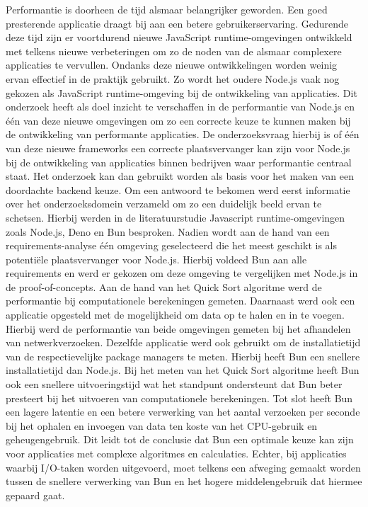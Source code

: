 Performantie is doorheen de tijd alsmaar belangrijker geworden. 
Een goed presterende applicatie draagt bij aan een betere gebruikerservaring.
Gedurende deze tijd zijn er voortdurend nieuwe JavaScript runtime-omgevingen ontwikkeld met telkens nieuwe verbeteringen om
zo de noden van de alsmaar complexere applicaties te vervullen. 
Ondanks deze nieuwe ontwikkelingen worden weinig ervan effectief in de praktijk gebruikt.
Zo wordt het oudere Node.js vaak nog gekozen als JavaScript runtime-omgeving bij de ontwikkeling van applicaties.
Dit onderzoek heeft als doel inzicht te verschaffen in de performantie van Node.js en één van deze nieuwe omgevingen
om zo een correcte keuze te kunnen maken bij de ontwikkeling van performante applicaties.
De onderzoeksvraag hierbij is of één van deze nieuwe frameworks  
een correcte plaatsvervanger kan zijn voor Node.js bij de ontwikkeling van applicaties binnen bedrijven 
waar performantie centraal staat. Het onderzoek kan dan gebruikt worden als basis 
voor het maken van een doordachte backend keuze.
Om een antwoord te bekomen werd eerst informatie over het onderzoeksdomein verzameld om zo een duidelijk beeld ervan te schetsen.
Hierbij werden in de literatuurstudie Javascript runtime-omgevingen zoals Node.js, Deno en Bun besproken.
Nadien wordt aan de hand van een requirements-analyse één omgeving geselecteerd die het meest geschikt is als potentiële plaatsvervanger voor Node.js.
Hierbij voldeed Bun aan alle requirements en werd er gekozen om deze omgeving te vergelijken met Node.js in de proof-of-concepts.
Aan de hand van het Quick Sort algoritme werd de performantie bij computationele berekeningen gemeten.
Daarnaast werd ook een applicatie opgesteld met de mogelijkheid om data op te halen en in te voegen. 
Hierbij werd de performantie van beide omgevingen gemeten bij het afhandelen van netwerkverzoeken.
Dezelfde applicatie werd ook gebruikt om de installatietijd van de respectievelijke package managers te meten.
Hierbij heeft Bun een snellere installatietijd dan Node.js.
Bij het meten van het Quick Sort algoritme heeft Bun ook een snellere uitvoeringstijd wat het standpunt 
ondersteunt dat Bun beter presteert bij het uitvoeren van computationele berekeningen.
Tot slot heeft Bun een lagere latentie en een betere verwerking van het aantal verzoeken per seconde bij het ophalen en
invoegen van data ten koste van het CPU-gebruik en geheugengebruik.
Dit leidt tot de conclusie dat Bun een optimale keuze kan zijn voor applicaties met complexe algoritmes en calculaties. Echter, 
bij applicaties waarbij I/O-taken worden uitgevoerd, moet telkens een afweging gemaakt worden tussen de snellere verwerking van Bun
en het hogere middelengebruik dat hiermee gepaard gaat.



